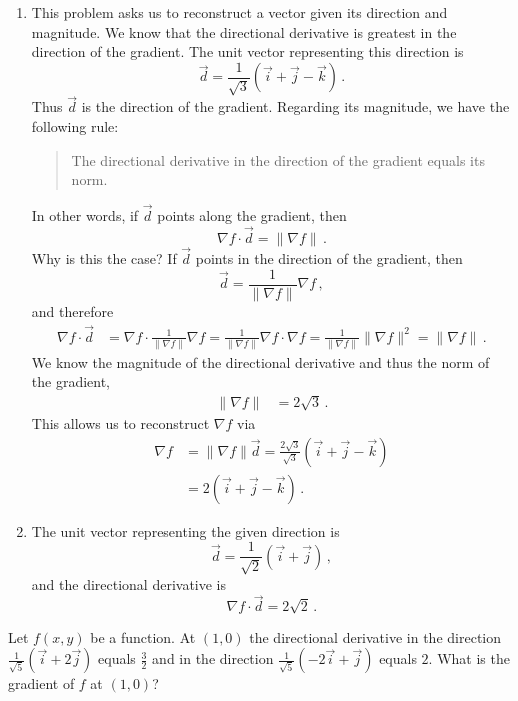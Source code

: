 \begin{solution}
\begin{enumerate}
\item
This problem asks us to reconstruct a vector given its direction and magnitude. We know that the directional derivative is greatest in the direction of the gradient. The unit vector representing this direction is
\[
\vec d = \frac{1}{\sqrt{3}} \left( \vec i + \vec j - \vec k \right)\,.
\]
Thus $\vec d$ is the direction of the gradient. Regarding its magnitude, we have the following rule:
\begin{quote}
The directional derivative in the direction of the gradient equals its norm.
\end{quote}
 In other words, if $\vec d$ points along the gradient, then
\[
\nabla f \cdot \vec d = \| \nabla f \|\,.
\]
Why is this the case? If $\vec d$ points in the direction of the gradient, then
\[
\vec d = \frac{1}{\| \nabla f \|} \nabla f\,,
\]
and therefore
\begin{align*}
\nabla f \cdot \vec d &= \nabla f \cdot \frac{1}{\| \nabla f \|} \nabla f
= \frac{1}{\| \nabla f\|} \nabla f \cdot \nabla f
= \frac{1}{\| \nabla f \|} \| \nabla f \|^2
= \| \nabla f \|\,.
\end{align*}
We know the magnitude of the directional derivative and thus the norm of the gradient,
\begin{align*}
\| \nabla f\| &= 2\sqrt{3}\,.
\end{align*}
This allows us to reconstruct $\nabla f$ via
\begin{align*}
\nabla f &= \| \nabla f \| \vec d
= \frac{2\sqrt{3}}{\sqrt{3}} \left( \vec i + \vec j - \vec k \right) \\
&= 2 \left( \vec i + \vec j - \vec k \right)\,.
\end{align*}

\item
The unit vector representing the given direction is
\[
\vec d = \frac{1}{\sqrt{2}} \left( \vec i + \vec j \right) \,,
\]
and the directional derivative is
\[
\nabla f \cdot \vec d = 2 \sqrt{2}\,.
\]
\end{enumerate}
\end{solution}

\begin{question}
Let $f(x,y)$ be a function. At $(1,0)$ the directional derivative in the direction $\frac{1}{\sqrt 5}\left( \vec i + 2 \vec j \right)$ equals $\frac 32$ and in the direction $\frac{1}{\sqrt 5}\left( -2 \vec i + \vec j \right)$ equals $2$. What is the gradient of $f$ at $(1,0)$?
\end{question}

